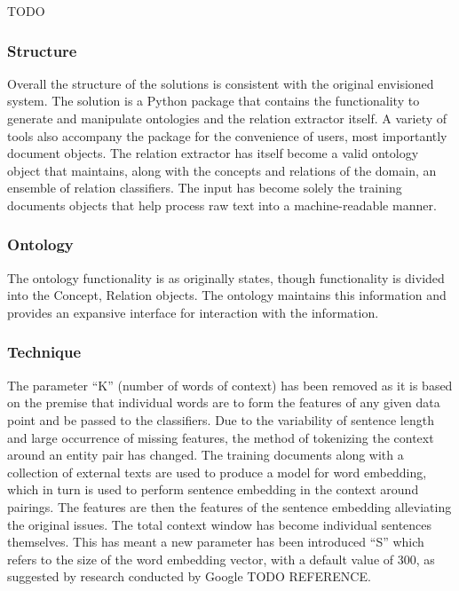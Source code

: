 \documentclass[11pt]{article} %
\begin{document}
TODO

\subsubsection{Structure}

Overall the structure of the solutions is consistent with the original envisioned system. The solution is a Python package that contains the functionality to generate and manipulate ontologies and the relation extractor itself. A variety of tools also accompany the package for the convenience of users, most importantly document objects. The relation extractor has itself become a valid ontology object that maintains, along with the concepts and relations of the domain, an ensemble of relation classifiers. The input has become solely the training documents objects that help process raw text into a machine-readable manner.

\subsubsection{Ontology}

The ontology functionality is as originally states, though functionality is divided into the Concept, Relation objects. The ontology maintains this information and provides an expansive interface for interaction with the information.

\subsubsection{Technique}

The parameter “K” (number of words of context) has been removed as it is based on the premise that individual words are to form the features of any given data point and be passed to the classifiers. Due to the variability of sentence length and large occurrence of missing features, the method of tokenizing the context around an entity pair has changed. The training documents along with a collection of external texts are used to produce a model for word embedding, which in turn is used to perform sentence embedding in the context around pairings. The features are then the features of the sentence embedding alleviating the original issues. The total context window has become individual sentences themselves. This has meant a new parameter has been introduced “S” which refers to the size of the word embedding vector, with a default value of 300, as suggested by research conducted by Google TODO REFERENCE.
\end{document}
